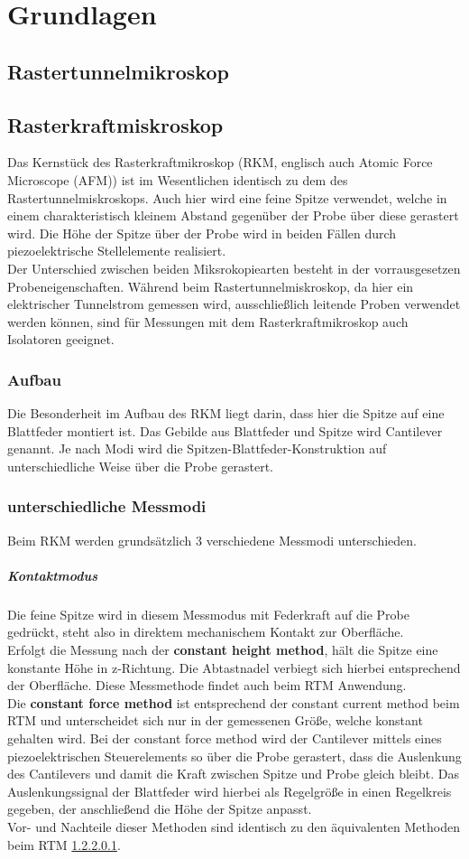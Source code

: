 \documentclass[a4paper,twoside,final]{article}
\begin{document}
\section{Grundlagen} \label{sec:Grundlagen}
\subsection{Rastertunnelmikroskop}
\subsection{Rasterkraftmiskroskop}
Das Kernstück des Rasterkraftmikroskop (RKM, englisch auch Atomic Force Microscope (AFM)) ist im Wesentlichen identisch zu dem des Rastertunnelmiskroskops. Auch hier wird eine feine Spitze verwendet, welche in einem charakteristisch kleinem Abstand gegenüber der Probe über diese gerastert wird. Die Höhe der Spitze über der Probe wird in beiden Fällen durch piezoelektrische Stellelemente realisiert. \\
Der Unterschied zwischen beiden Miksrokopiearten besteht in der vorrausgesetzen Probeneigenschaften. Während beim Rastertunnelmiskroskop, da hier ein elektrischer Tunnelstrom gemessen wird, ausschließlich leitende Proben verwendet werden können, sind für Messungen mit dem Rasterkraftmikroskop auch Isolatoren geeignet.

\subsubsection{Aufbau}
Die Besonderheit im Aufbau des RKM liegt darin, dass hier die Spitze auf eine Blattfeder montiert ist. Das Gebilde aus Blattfeder und Spitze wird Cantilever genannt. Je nach Modi wird die Spitzen-Blattfeder-Konstruktion auf unterschiedliche Weise über die Probe gerastert.

\subsubsection{unterschiedliche Messmodi}
Beim RKM werden grundsätzlich 3 verschiedene Messmodi unterschieden.
\subparagraph{Kontaktmodus}
Die feine Spitze wird in diesem Messmodus mit Federkraft auf die Probe gedrückt, steht also in direktem mechanischem Kontakt zur Oberfläche. \\
Erfolgt die Messung nach der \textbf{constant height method}, hält die Spitze eine konstante Höhe in z-Richtung. Die Abtastnadel verbiegt sich hierbei entsprechend der Oberfläche. Diese Messmethode findet auch beim RTM Anwendung. \\
Die \textbf{constant force method} ist entsprechend der constant current method beim RTM und unterscheidet sich nur in der gemessenen Größe, welche konstant gehalten wird. Bei der constant force method wird der Cantilever mittels eines piezoelektrischen Steuerelements so über die Probe gerastert, dass die Auslenkung des Cantilevers und damit die Kraft zwischen Spitze und Probe gleich bleibt. Das Auslenkungssignal der Blattfeder wird hierbei als Regelgröße in einen Regelkreis gegeben, der anschließend die Höhe der Spitze anpasst.\\
Vor- und Nachteile dieser Methoden sind identisch zu den äquivalenten Methoden beim RTM \ref{}.
\end{document}
